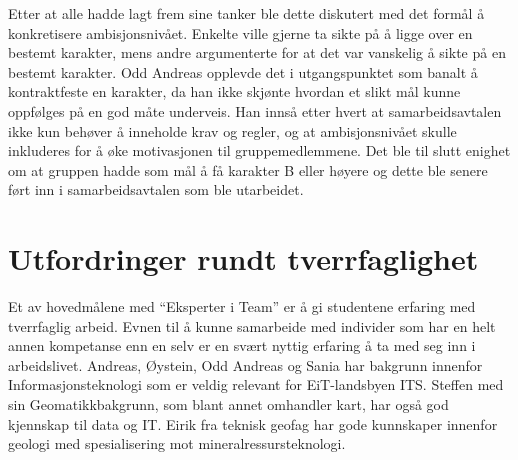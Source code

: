 \documentclass[a4paper,norsk,oneside]{article}
\begin{document}
Etter at alle hadde lagt frem sine tanker ble dette diskutert med det formål å konkretisere ambisjonsnivået. Enkelte ville gjerne ta sikte på å ligge over en bestemt karakter, mens andre argumenterte for at det var vanskelig å sikte på en bestemt karakter. Odd Andreas opplevde det i utgangspunktet som banalt å kontraktfeste en karakter, da han ikke skjønte hvordan et slikt mål kunne oppfølges på en god måte underveis. Han innså etter hvert at samarbeidsavtalen ikke kun behøver å inneholde krav og regler, og at ambisjonsnivået skulle inkluderes for å øke motivasjonen til gruppemedlemmene. Det ble til slutt enighet om at gruppen hadde som mål å få karakter B eller høyere og dette ble senere ført inn i samarbeidsavtalen som ble utarbeidet.

\section{Utfordringer rundt tverrfaglighet}
Et av hovedmålene med “Eksperter i Team” er å gi studentene erfaring med tverrfaglig arbeid. Evnen til å kunne samarbeide med individer som har en helt annen kompetanse enn en selv er en svært nyttig erfaring å ta med seg inn i arbeidslivet. Andreas, Øystein, Odd Andreas og Sania har bakgrunn innenfor Informasjonsteknologi som er veldig relevant for EiT-landsbyen ITS. Steffen med sin Geomatikkbakgrunn, som blant annet omhandler kart, har også god kjennskap til data og IT. Eirik fra teknisk geofag har gode kunnskaper innenfor geologi med spesialisering mot mineralressursteknologi. 
\end{document}
